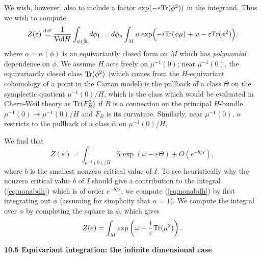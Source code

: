 \documentclass[12pt]{article}
\begin{document}
We wish, however, also to include a factor 
$\exp ( - \varepsilon {\rm Tr} (\phi^2) )$ in the integrand. 
Thus we wish to compute 
\begin{equation} \labell{eq:nonabdh}
Z (\varepsilon) \eqdef \frac{1}{\voll H} \int_{\phi\in \lieh} 
d\phi_1 \dots d\phi_n \int_M 
 \alpha \exp  \Bigl ( -i \Tr (\phi \mu) + \omega - \varepsilon 
\Tr (\phi^2) \Bigr ) ,
\end{equation}
where $\alpha = \alpha(\phi) $ is an equivariantly closed form  on $M$ which 
has \emph{polynomial} dependence on $\phi$. 
We assume $H$ acts freely on $\mu^{-1}(0)$; 
near $\mu^{-1}(0)$, the equivariantly closed class
${\rm Tr} (\phi^2) $ (which comes from the $H$-equivariant cohomology of a 
point in the Cartan model) is the pullback of a 
class $\Theta $ on the symplectic quotient $\mu^{-1}(0)/H$, which
is the class which would be evaluated in Chern-Weil theory as 
${\rm Tr} (F_B^2)$  if $B$ is a connection on the principal $H$-bundle
$\mu^{-1}(0) \to \mu^{-1}(0)/H$ and $F_B$ is its curvature. 
Similarly, near $\mu^{-1}(0)$, $\alpha$ restricts to the pullback
of a class $\hat{\alpha} $ on $\mu^{-1}(0)/H$.

We find  that 
$$ Z(\varepsilon) = \int_{\mu^{-1}(0)/H} 
\hat{\alpha} \exp (\omega - \varepsilon \Theta) 
+ O (e^{-b/\varepsilon}), $$
where $b$ is the smallest nonzero critical value of $I$. 
To see heuristically why the nonzero critical value $b$ of
$I$ should give a contribution to the integral 
(\ref{eq:nonabdh}) which is of order $e^{-b/\varepsilon}$, 
we compute (\ref{eq:nonabdh}) by first integrating out $\phi$ 
(assuming for simplicity that $\alpha = 1$). We compute the
integral over $\phi$ by completing the square in $\phi$, 
which gives 
$$ Z (\varepsilon) = \int_{M} \exp  \left (\omega - \frac{1}{\varepsilon}
{\rm Tr} (\mu^2) \right ). $$








{\bf 10.5 Equivariant integration: the infinite dimensional case}
\end{document}

